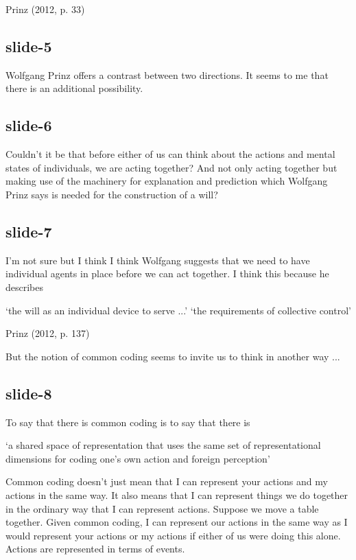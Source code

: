 \documentclass[14pt,\papersize]{extarticle}
\begin{document}
            
Prinz (2012, p. 33)

 
\subsection{slide-5}
Wolfgang Prinz offers a contrast between two directions.
It seems to me that there is an additional possibility.
 
\subsection{slide-6}
Couldn't it be that before either of us can think about 
the actions and mental states of individuals, we are acting
together?
And not only acting together but making use of the machinery
for explanation and prediction which Wolfgang Prinz says 
is needed for the construction of a will?
 
\subsection{slide-7}
I'm not sure but I think
I think Wolfgang suggests that we need to have individual agents
in place before we can act together.
I think this because he describes
 
‘the will as an individual device to serve ...’ ‘the requirements of collective control’


          
Prinz (2012, p. 137)

 
But the notion of common coding seems to invite us to think in another way ...
 
\subsection{slide-8}
To say that there is common coding is to say that there is
 
‘a shared space of representation that uses the same set of 
representational dimensions for coding one’s own action and 
foreign perception’
 
Common coding doesn't just mean that I can represent your actions 
and my actions in the same way.
It also means that I can represent things we do together in the ordinary
way that I can represent actions.
Suppose we move a table together.
Given common coding, I can represent our actions in the same
way as I would represent your actions or my actions if either of us
were doing this alone.  Actions are represented in terms of events.
 
\end{document}
